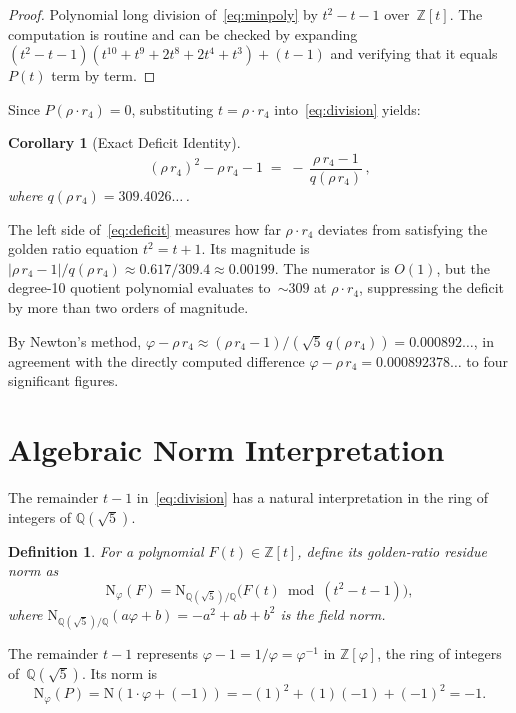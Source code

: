 \documentclass[12pt]{article}
\newtheorem{corollary}[theorem]{Corollary}
\newtheorem{definition}[theorem]{Definition}
\newcommand{\Z}{\mathbb{Z}}
\newcommand{\Q}{\mathbb{Q}}
\newcommand{\N}{\mathrm{N}}
\begin{document}
\begin{proof}
Polynomial long division of~\eqref{eq:minpoly} by $t^2 - t - 1$
over~$\Z[t]$. The computation is routine and can be checked by
expanding $(t^2 - t - 1)(t^{10} + t^9 + 2t^8 + 2t^4 + t^3) + (t-1)$
and verifying that it equals~$P(t)$ term by term.
\end{proof}

Since $P(\rho \cdot r_4) = 0$, substituting $t = \rho \cdot r_4$
into~\eqref{eq:division} yields:

\begin{corollary}[Exact Deficit Identity]\label{cor:deficit}
\begin{equation}\label{eq:deficit}
  (\rho \, r_4)^2 - \rho \, r_4 - 1
  \;=\; -\,\frac{\rho \, r_4 - 1}{q(\rho \, r_4)}\,,
\end{equation}
where $q(\rho \, r_4) = 309.4026\ldots$\,.
\end{corollary}

The left side of~\eqref{eq:deficit} measures how far $\rho \cdot r_4$
deviates from satisfying the golden ratio equation $t^2 = t + 1$.
Its magnitude is $|\rho \, r_4 - 1| / q(\rho \, r_4) \approx
0.617 / 309.4 \approx 0.00199$. The numerator is $O(1)$, but the
degree-10 quotient polynomial evaluates to~$\sim\!309$ at
$\rho \cdot r_4$, suppressing the deficit by more than two orders
of magnitude.

By Newton's method, $\varphi - \rho \, r_4 \approx
(\rho \, r_4 - 1) / (\sqrt{5}\, q(\rho \, r_4)) = 0.000892\ldots$,
in agreement with the directly computed difference
$\varphi - \rho \, r_4 = 0.000892378\ldots$ to four significant
figures.


\section{Algebraic Norm Interpretation}

The remainder $t - 1$ in~\eqref{eq:division} has a natural
interpretation in the ring of integers of $\Q(\sqrt{5})$.

\begin{definition}
For a polynomial $F(t) \in \Z[t]$, define its
\emph{golden-ratio residue norm} as
\[
  \N_\varphi(F) = \N_{\Q(\sqrt{5})/\Q}\!\big(F(t)
    \bmod (t^2 - t - 1)\big),
\]
where $\N_{\Q(\sqrt{5})/\Q}(a\varphi + b) =
-a^2 + ab + b^2$ is the field norm.
\end{definition}

The remainder $t - 1$ represents $\varphi - 1 = 1/\varphi
= \varphi^{-1}$ in $\Z[\varphi]$, the ring of integers
of~$\Q(\sqrt{5})$. Its norm is
\[
  \N_\varphi(P) = \N(1 \cdot \varphi + (-1))
  = -(1)^2 + (1)(-1) + (-1)^2 = -1.
\]
\end{document}

